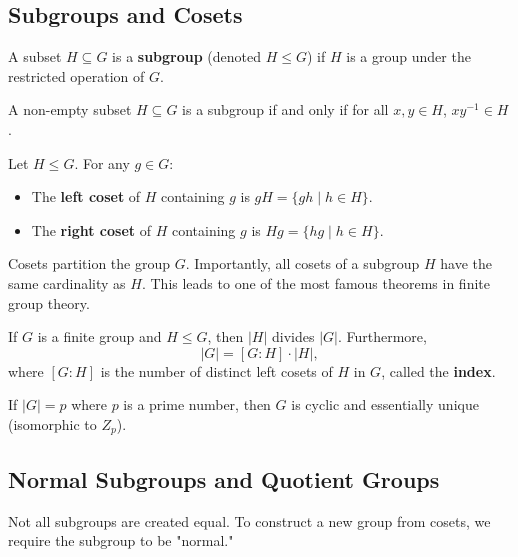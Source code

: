 \subsection{Subgroups and Cosets}

\begin{definition}[Subgroup]
A subset $H \subseteq G$ is a \textbf{subgroup} (denoted $H \leq G$) if $H$ is a group under the restricted operation of $G$.
\end{definition}

\begin{lemma}
A non-empty subset $H \subseteq G$ is a subgroup if and only if for all $x, y \in H$, $xy^{-1} \in H$.
\end{lemma}

\begin{definition}[Cosets]
Let $H \leq G$. For any $g \in G$:
\begin{itemize}
    \item The \textbf{left coset} of $H$ containing $g$ is $gH = \{gh \mid h \in H\}$.
    \item The \textbf{right coset} of $H$ containing $g$ is $Hg = \{hg \mid h \in H\}$.
\end{itemize}
\end{definition}

Cosets partition the group $G$. Importantly, all cosets of a subgroup $H$ have the same cardinality as $H$. This leads to one of the most famous theorems in finite group theory.

\begin{theorem}
If $G$ is a finite group and $H \leq G$, then $|H|$ divides $|G|$. Furthermore,
\[ |G| = [G:H] \cdot |H|, \]
where $[G:H]$ is the number of distinct left cosets of $H$ in $G$, called the \textbf{index}.
\end{theorem}

\begin{corollary}
    If $|G| = p$ where $p$ is a prime number, then $G$ is cyclic and essentially unique (isomorphic to $Z_p$).
\end{corollary}

\subsection{Normal Subgroups and Quotient Groups}

Not all subgroups are created equal. To construct a new group from cosets, we require the subgroup to be "normal."


